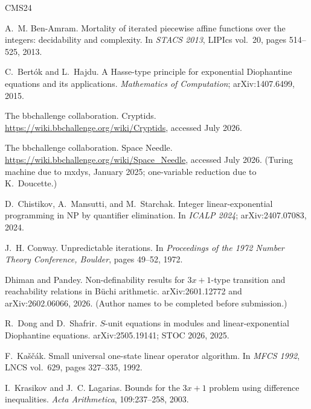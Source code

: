 \documentclass[11pt]{article}
\theoremstyle{definition}
\theoremstyle{remark}
\begin{document}
\begin{thebibliography}{CMS24}

A.~M. Ben-Amram.
\newblock Mortality of iterated piecewise affine functions over the integers:
  decidability and complexity.
\newblock In \emph{STACS 2013}, LIPIcs vol.~20, pages 514--525, 2013.

C.~Bert\'ok and L.~Hajdu.
\newblock A Hasse-type principle for exponential Diophantine equations and its
  applications.
\newblock \emph{Mathematics of Computation}; arXiv:1407.6499, 2015.

The bbchallenge collaboration.
\newblock Cryptids.
\newblock \url{https://wiki.bbchallenge.org/wiki/Cryptids}, accessed July 2026.

The bbchallenge collaboration.
\newblock Space Needle.
\newblock \url{https://wiki.bbchallenge.org/wiki/Space_Needle}, accessed July
  2026.  (Turing machine due to mxdys, January 2025; one-variable reduction due
  to K.~Doucette.)

D.~Chistikov, A.~Mansutti, and M.~Starchak.
\newblock Integer linear-exponential programming in NP by quantifier
  elimination.
\newblock In \emph{ICALP 2024}; arXiv:2407.07083, 2024.

J.~H. Conway.
\newblock Unpredictable iterations.
\newblock In \emph{Proceedings of the 1972 Number Theory Conference, Boulder},
  pages 49--52, 1972.

Dhiman and Pandey.
\newblock Non-definability results for $3x{+}1$-type transition and
  reachability relations in B\"uchi arithmetic.
\newblock arXiv:2601.12772 and arXiv:2602.06066, 2026.
\newblock (Author names to be completed before submission.)

R.~Dong and D.~Shafrir.
\newblock $S$-unit equations in modules and linear-exponential Diophantine
  equations.
\newblock arXiv:2505.19141; STOC 2026, 2025.

F.~Ka\v{s}\v{c}\'ak.
\newblock Small universal one-state linear operator algorithm.
\newblock In \emph{MFCS 1992}, LNCS vol.~629, pages 327--335, 1992.

I.~Krasikov and J.~C. Lagarias.
\newblock Bounds for the $3x+1$ problem using difference inequalities.
\newblock \emph{Acta Arithmetica}, 109:237--258, 2003.


\end{thebibliography}
\end{document}

